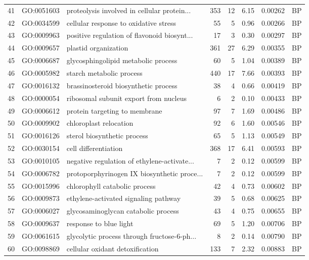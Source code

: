 \documentclass[12pt,oneside,a4paper]{article}
\begin{document}
\begin{longtable}{rllrrrll}
  41 & GO:0051603 & proteolysis involved in cellular protein... & 353 &  12 & 6.15 & 0.00262 & BP \\ 
  42 & GO:0034599 & cellular response to oxidative stress &  55 &   5 & 0.96 & 0.00266 & BP \\ 
  43 & GO:0009963 & positive regulation of flavonoid biosynt... &  17 &   3 & 0.30 & 0.00297 & BP \\ 
  44 & GO:0009657 & plastid organization & 361 &  27 & 6.29 & 0.00355 & BP \\ 
  45 & GO:0006687 & glycosphingolipid metabolic process &  60 &   5 & 1.04 & 0.00389 & BP \\ 
  46 & GO:0005982 & starch metabolic process & 440 &  17 & 7.66 & 0.00393 & BP \\ 
  47 & GO:0016132 & brassinosteroid biosynthetic process &  38 &   4 & 0.66 & 0.00419 & BP \\ 
  48 & GO:0000054 & ribosomal subunit export from nucleus &   6 &   2 & 0.10 & 0.00433 & BP \\ 
  49 & GO:0006612 & protein targeting to membrane &  97 &   7 & 1.69 & 0.00486 & BP \\ 
  50 & GO:0009902 & chloroplast relocation &  92 &   6 & 1.60 & 0.00546 & BP \\ 
  51 & GO:0016126 & sterol biosynthetic process &  65 &   5 & 1.13 & 0.00549 & BP \\ 
  52 & GO:0030154 & cell differentiation & 368 &  17 & 6.41 & 0.00593 & BP \\ 
  53 & GO:0010105 & negative regulation of ethylene-activate... &   7 &   2 & 0.12 & 0.00599 & BP \\ 
  54 & GO:0006782 & protoporphyrinogen IX biosynthetic proce... &   7 &   2 & 0.12 & 0.00599 & BP \\ 
  55 & GO:0015996 & chlorophyll catabolic process &  42 &   4 & 0.73 & 0.00602 & BP \\ 
  56 & GO:0009873 & ethylene-activated signaling pathway &  39 &   5 & 0.68 & 0.00625 & BP \\ 
  57 & GO:0006027 & glycosaminoglycan catabolic process &  43 &   4 & 0.75 & 0.00655 & BP \\ 
  58 & GO:0009637 & response to blue light &  69 &   5 & 1.20 & 0.00706 & BP \\ 
  59 & GO:0061615 & glycolytic process through fructose-6-ph... &   8 &   2 & 0.14 & 0.00790 & BP \\ 
  60 & GO:0098869 & cellular oxidant detoxification & 133 &   7 & 2.32 & 0.00883 & BP \\ 

\end{longtable}
\end{document}
